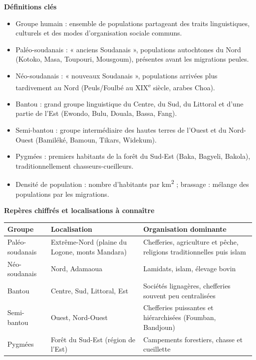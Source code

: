 \documentclass[11pt]{article}
\newcommand{\cle}[1]{{\popxbold\color{popdark}#1}}
\begin{document}
\begin{bilan}
\textbf{Définitions clés}
\begin{itemize}
  \item \cle{Groupe humain} : ensemble de populations partageant des traits linguistiques, culturels et des modes d'organisation sociale communs.
  \item \cle{Paléo-soudanais} : « anciens Soudanais », populations autochtones du Nord (Kotoko, Masa, Toupouri, Mousgoum), présentes avant les migrations peules.
  \item \cle{Néo-soudanais} : « nouveaux Soudanais », populations arrivées plus tardivement au Nord (Peuls/Foulbé au XIX\textsuperscript{e} siècle, arabes Choa).
  \item \cle{Bantou} : grand groupe linguistique du Centre, du Sud, du Littoral et d'une partie de l'Est (Ewondo, Bulu, Douala, Bassa, Fang).
  \item \cle{Semi-bantou} : groupe intermédiaire des hautes terres de l'Ouest et du Nord-Ouest (Bamiléké, Bamoun, Tikars, Widekum).
  \item \cle{Pygmées} : premiers habitants de la forêt du Sud-Est (Baka, Bagyeli, Bakola), traditionnellement chasseurs-cueilleurs.
  \item \cle{Densité de population} : nombre d'habitants par km\textsuperscript{2} ; \cle{brassage} : mélange des populations par les migrations.
\end{itemize}

\textbf{Repères chiffrés et localisations à connaître}
\begin{center}
\begin{tabularx}{\linewidth}{|l|X|X|}\hline
\rowcolor{popblueL} \textbf{Groupe} & \textbf{Localisation} & \textbf{Organisation dominante} \\ \hline
Paléo-soudanais & Extrême-Nord (plaine du Logone, monts Mandara) & Chefferies, agriculture et pêche, religions traditionnelles puis islam \\ \hline
Néo-soudanais & Nord, Adamaoua & Lamidats, islam, élevage bovin \\ \hline
Bantou & Centre, Sud, Littoral, Est & Sociétés lignagères, chefferies souvent peu centralisées \\ \hline
Semi-bantou & Ouest, Nord-Ouest & Chefferies puissantes et hiérarchisées (Foumban, Bandjoun) \\ \hline
Pygmées & Forêt du Sud-Est (région de l'Est) & Campements forestiers, chasse et cueillette \\ \hline
\end{tabularx}
\end{center}


\end{bilan}
\end{document}

